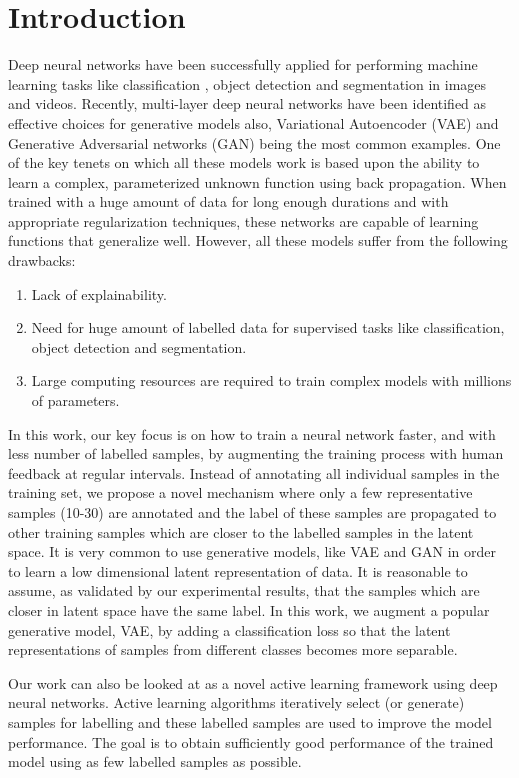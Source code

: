 \documentclass[runningheads]{llncs}
\begin{document}
\section{Introduction}
Deep neural networks have been successfully applied  for performing machine learning tasks like classification \cite{alexnet,vggnet,resnet}, object detection \cite{faster_rcnn,yolo} and segmentation \cite{deeplab,unet} in images and videos.
Recently, multi-layer deep neural networks have been identified as  effective  choices for  generative models also, Variational Autoencoder (VAE) \cite{vae} and Generative Adversarial networks (GAN) \cite{gan} being the most common examples.
One of the key tenets on which all these models work is  based upon the ability to learn a complex, parameterized unknown function using back propagation.
When trained with a huge amount of data for long enough durations and with appropriate regularization techniques, these networks are capable of learning functions that generalize well.
However, all these  models suffer from the following drawbacks:
\begin{enumerate}
  \item Lack of explainability.
  \item Need for huge amount of labelled data for supervised tasks like classification, object detection and segmentation.
  \item Large computing resources are required to train complex models with millions of parameters.
\end{enumerate}

In this work, our key focus is on how to train a neural network faster, and with less number of labelled samples, by augmenting the training process with human feedback at regular intervals.
Instead of annotating all individual samples in the training set, we propose a novel mechanism where only a few representative samples (10-30) are annotated and the label of these samples are propagated to other training samples  which are closer to the labelled samples in the latent space.
It is very common to use  generative models, like VAE \cite{vae} and GAN\cite{gan} in order to learn a low dimensional latent representation of data.
It is reasonable to assume, as validated by our experimental results, that the samples which are closer in latent space have the same label.
In this work, we augment a popular generative model, VAE,  by adding a classification loss so that the latent representations of samples from different classes becomes more separable.

Our work can also be looked at  as a novel  active learning framework using deep neural networks.
Active learning algorithms iteratively select (or generate) samples for labelling and these labelled samples are used to improve the model performance.
The goal is to obtain sufficiently good performance of the trained model using as few labelled samples as possible.
\end{document}
